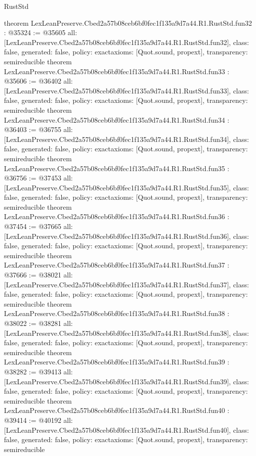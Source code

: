 \begin{lexlean}{RustStd}
\begin{coremodule}
{}
theorem LexLeanPreserve.Cbed2a57b08ceb6bf0fec1f135a9d7a44.R1.RustStd.fun32 : @35324 := @35605 {
  all: [LexLeanPreserve.Cbed2a57b08ceb6bf0fec1f135a9d7a44.R1.RustStd.fun32],
  class: false,
  generated: false,
  policy: exact{axioms: [Quot.sound, propext]},
  transparency: semireducible
}
theorem LexLeanPreserve.Cbed2a57b08ceb6bf0fec1f135a9d7a44.R1.RustStd.fun33 : @35606 := @36402 {
  all: [LexLeanPreserve.Cbed2a57b08ceb6bf0fec1f135a9d7a44.R1.RustStd.fun33],
  class: false,
  generated: false,
  policy: exact{axioms: [Quot.sound, propext]},
  transparency: semireducible
}
theorem LexLeanPreserve.Cbed2a57b08ceb6bf0fec1f135a9d7a44.R1.RustStd.fun34 : @36403 := @36755 {
  all: [LexLeanPreserve.Cbed2a57b08ceb6bf0fec1f135a9d7a44.R1.RustStd.fun34],
  class: false,
  generated: false,
  policy: exact{axioms: [Quot.sound, propext]},
  transparency: semireducible
}
theorem LexLeanPreserve.Cbed2a57b08ceb6bf0fec1f135a9d7a44.R1.RustStd.fun35 : @36756 := @37453 {
  all: [LexLeanPreserve.Cbed2a57b08ceb6bf0fec1f135a9d7a44.R1.RustStd.fun35],
  class: false,
  generated: false,
  policy: exact{axioms: [Quot.sound, propext]},
  transparency: semireducible
}
theorem LexLeanPreserve.Cbed2a57b08ceb6bf0fec1f135a9d7a44.R1.RustStd.fun36 : @37454 := @37665 {
  all: [LexLeanPreserve.Cbed2a57b08ceb6bf0fec1f135a9d7a44.R1.RustStd.fun36],
  class: false,
  generated: false,
  policy: exact{axioms: [Quot.sound, propext]},
  transparency: semireducible
}
theorem LexLeanPreserve.Cbed2a57b08ceb6bf0fec1f135a9d7a44.R1.RustStd.fun37 : @37666 := @38021 {
  all: [LexLeanPreserve.Cbed2a57b08ceb6bf0fec1f135a9d7a44.R1.RustStd.fun37],
  class: false,
  generated: false,
  policy: exact{axioms: [Quot.sound, propext]},
  transparency: semireducible
}
theorem LexLeanPreserve.Cbed2a57b08ceb6bf0fec1f135a9d7a44.R1.RustStd.fun38 : @38022 := @38281 {
  all: [LexLeanPreserve.Cbed2a57b08ceb6bf0fec1f135a9d7a44.R1.RustStd.fun38],
  class: false,
  generated: false,
  policy: exact{axioms: [Quot.sound, propext]},
  transparency: semireducible
}
theorem LexLeanPreserve.Cbed2a57b08ceb6bf0fec1f135a9d7a44.R1.RustStd.fun39 : @38282 := @39413 {
  all: [LexLeanPreserve.Cbed2a57b08ceb6bf0fec1f135a9d7a44.R1.RustStd.fun39],
  class: false,
  generated: false,
  policy: exact{axioms: [Quot.sound, propext]},
  transparency: semireducible
}
theorem LexLeanPreserve.Cbed2a57b08ceb6bf0fec1f135a9d7a44.R1.RustStd.fun40 : @39414 := @40192 {
  all: [LexLeanPreserve.Cbed2a57b08ceb6bf0fec1f135a9d7a44.R1.RustStd.fun40],
  class: false,
  generated: false,
  policy: exact{axioms: [Quot.sound, propext]},
  transparency: semireducible
}
\end{coremodule}
\end{lexlean}
